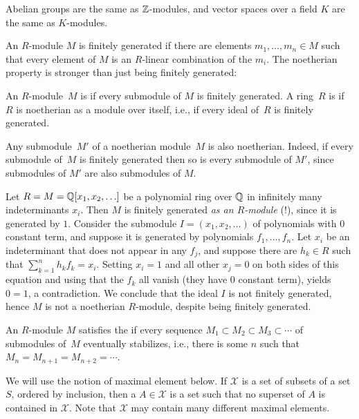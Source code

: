 \begin{example}
Abelian groups are the same as $\mathbb{Z}$-modules, and vector spaces
over a field $K$ are the same as $K$-modules.
\end{example}

An $R$-module $M$ is finitely generated if there are elements $m_1, \ldots, m_n\in M$
such that every element of $M$ is an $R$-linear combination of the $m_i$.  The noetherian
property is stronger than just being finitely generated:

\begin{definition}[Noetherian] An $R$-module~$M$ is  if every
submodule of $M$ is finitely generated.  A ring~$R$ is
 if~$R$ is noetherian as a module over itself, i.e.,
if every ideal of~$R$ is finitely generated.
\end{definition}

Any submodule~$M'$ of a noetherian module~$M$ is also noetherian.
Indeed, if every submodule of~$M$ is finitely generated then so is
every submodule of $M'$, since submodules of $M'$ are also submodules
of $M$.

\begin{example}
Let $R=M=\mathbb{Q}[x_1,x_2,\ldots]$ be a polynomial ring over $\mathbb{Q}$ in
infinitely many indeterminants $x_i$.  Then $M$ is finitely generated
{\em as an $R$-module} (!), since it is generated by $1$.  Consider
the submodule $I=(x_1,x_2,\ldots)$ of polynomials with $0$ constant
term, and suppose it is generated by polynomials $f_1, \ldots, f_n$.
Let $x_i$ be an indeterminant that does not appear in any $f_j$, and
suppose there are $h_k\in R$ such that $\sum_{k=1}^n h_k f_k = x_i$.
Setting $x_i=1$ and all other $x_j=0$ on both sides of this equation
and using that the $f_k$ all vanish (they have 0 constant term),
yields $0=1$, a contradiction.  We conclude that the ideal $I$ is not
finitely generated, hence $M$ is not a noetherian $R$-module, despite
being finitely generated.
\end{example}

\begin{definition}
An $R$-module $M$ satisfies the  if
every sequence $M_1\subset M_2 \subset M_3 \subset \cdots$ of
submodules of~$M$ eventually stabilizes, i.e., there is some $n$ such
that $M_n=M_{n+1}=M_{n+2}=\cdots$.
\end{definition}
We will use the notion of maximal element below.  If $\mathcal{X}$ is
a set of subsets of a set $S$, ordered by inclusion, then a
 $A\in \mathcal{X}$ is a set such that no superset
of $A$ is contained in $\mathcal{X}$.  Note that $\mathcal{X}$ may 
contain many different maximal elements.

